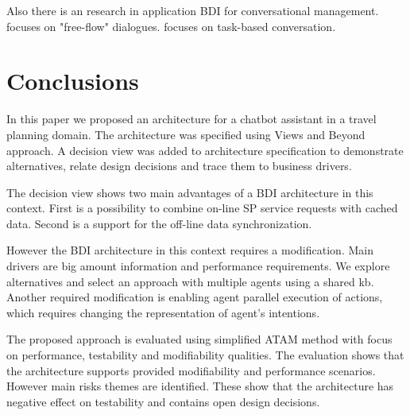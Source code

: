 \documentclass{llncs}
\begin{document}
Also there is an research in application \gls{BDI} for conversational management. \cite{wong2012conversation} focuses on "free-flow" dialogues. \cite{nguyen2005agent} focuses on task-based conversation.



\section{Conclusions}
\label{sec:conclusions}
In this paper we proposed an architecture for a chatbot assistant in a travel planning domain. The architecture was specified using Views and Beyond \cite{bachmann2010documenting} approach. A decision view was added to architecture specification to demonstrate alternatives, relate design decisions and trace them to business drivers.

The decision view shows two main advantages of a \gls{BDI} architecture in this context. First is a possibility to combine on-line \gls{SP} service requests with cached data. Second is a support for the off-line data synchronization.  

However the \gls{BDI} architecture in this context requires a modification. Main drivers are big amount information and performance requirements. We explore alternatives and select an approach with multiple agents using a shared \gls{kb}. Another required modification is enabling agent parallel execution of actions, which requires changing the representation of agent's intentions.


The proposed approach is evaluated using simplified \gls{ATAM} method with focus on performance, testability and modifiability qualities. The evaluation shows that the architecture supports provided modifiability and performance scenarios. However main risks themes are identified. These show that the architecture has negative effect on testability and contains open design decisions. 






\end{document}
